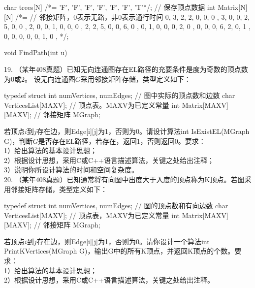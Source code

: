 \begin{exercise}
\begin{cppcode}
    char trees[N] /*= {'F', 'F', 'F', 'F', 'F', 'F', 'T'}*/;    // 保存顶点数据
    int Matrix[N][N] /*= {    // 邻接矩阵，0表示无路，非0表示通行时间
        { 0, 3, 2, 2, 0, 0, 0 },
        { 3, 0, 0, 2, 5, 0, 0 },
        { 2, 0, 0, 1, 0, 0, 0 },
        { 2, 2, 5, 0, 0, 6, 0 },
        { 0, 1, 0, 0, 0, 2, 0 },
        { 0, 0, 0, 6, 2, 0, 1 },
        { 0, 0, 0, 0, 0, 1, 0 },
    }*/;
    
    void FindPath(int u) {

    }
\end{cppcode}

\vspace{\baselineskip}

19. （某年408真题）已知无向连通图存在EL路径的充要条件是度为奇数的顶点数为0或2。
设无向连通图$G$采用邻接矩阵存储，类型定义如下：
\begin{cppcode}
    typedef struct {
        int numVertices, numEdges;  // 图中实际的顶点数和边数
        char VerticesList[MAXV];    // 顶点表。MAXV为已定义常量
        int Matrix[MAXV][MAXV];       // 邻接矩阵
    }MGraph;
\end{cppcode}

若顶点$i$到$j$存在边，则Edge[i][j]为1，否则为0。请设计算法int IsExistEL(MGraph G)，判断$G$是否存在EL路径，若存在，返回1，否则返回0。要求：\\
1）给出算法的基本设计思想；\\
2）根据设计思想，采用C或C++语言描述算法，关键之处给出注释；\\
3）说明你所设计算法的时间和空间复杂度。\\

20. （某年408真题）已知通常将有向图中出度大于入度的顶点称为K顶点。若图采用邻接矩阵存储，类型定义如下：
\begin{cppcode}
    typedef struct {
        int numVertices, numEdges;  // 图的顶点数和有向边数
        char VerticesList[MAXV];    // 顶点表，MAXV为已定义常量
        int Matrix[MAXV][MAXV];       // 邻接矩阵
    }MGraph;
\end{cppcode}
若顶点$i$到$j$存在边，则Edge[i][j]为1，否则为0。请你设计一个算法int PrintKVertices(MGraph G)，输出G中的所有K顶点，并返回K顶点的个数。要求：\\
1）给出算法的基本设计思想；\\
2）根据设计思想，采用C或C++语言描述算法，关键之处给出注释。\\




\end{exercise}
\clearpage


